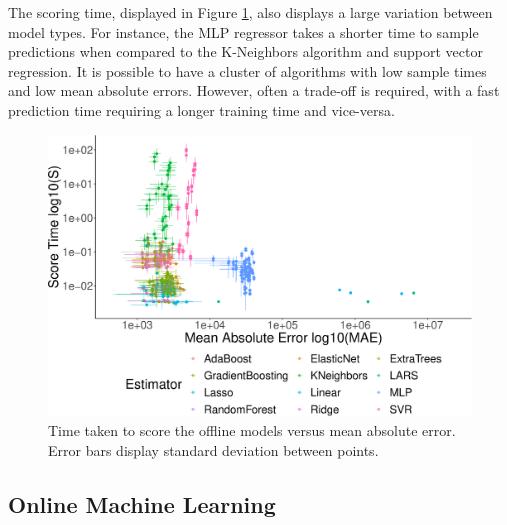 The scoring time, displayed in Figure \ref{fig:offline_score_time_vs_mae}, also displays a large variation between model types. For instance, the MLP regressor takes a shorter time to sample predictions when compared to the K-Neighbors algorithm and support vector regression. It is possible to have a cluster of algorithms with low sample times and low mean absolute errors. However, often a trade-off is required, with a fast prediction time requiring a longer training time and vice-versa. 



\begin{figure}[h]
\centering
\includegraphics[width=\columnwidth]{Chapter5/figures/market-forecasting/results/offline_score_time_vs_mae_all_results_opaque.eps}
\caption{Time taken to score the offline models versus mean absolute error. Error bars display standard deviation between points.}
\label{fig:offline_score_time_vs_mae}
\end{figure}









\subsection{Online Machine Learning}

